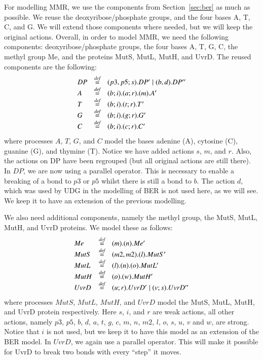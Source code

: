 \documentclass[review]{elsarticle}
\newcommand{\paral}{\; \vert \;}
\newcommand{\bydef}{\stackrel{\emph{def}}{=}}
\begin{document}
For modelling MMR, we use the components from Section~\ref{sec:ber} as much as possible. We reuse the deoxyribose/phosphate groups, and the four bases A, T, C, and G. We will extend those components where needed, but we will keep the original actions. Overall, in order to model MMR, we need the following components: deoxyribose/phosphate groups, the four bases A, T, G, C, the methyl group Me, and the proteins MutS, MutL, MutH, and UvrD. The reused components are the following:
%
$$\begin{array}{lll}
DP & \bydef & (p3,p5;s).DP' \paral (b,d).DP''\\
A & \bydef & (b;i).(a;r).(m).A'\\
T & \bydef & (b;i).(t;r).T'\\
G & \bydef & (b;i).(g;r).G'\\
C & \bydef & (b;i).(c;r).C'\\
\end{array}$$
%
where processes $A$, $T$, $G$, and $C$ model the bases adenine (A), cytosine (C), guanine (G), and thymine (T). Notice we have added actions $s$, $m$, and $r$. Also, the actions on DP have been regrouped (but all original actions are still there). In $DP$, we are now using a parallel operator. This is necessary to enable a breaking of a bond to $p3$ or $p5$ whilst there is still a bond to $b$. The action $d$, which was used by UDG in the modelling of BER is not used here, as we will see. We keep it to have an extension of the previous modelling.

We also need additional components, namely the methyl group, the MutS, MutL, MutH, and UvrD proteins. We model these as follows:
$$\begin{array}{lll}
Me & \bydef & (m).(n).Me'\\
MutS & \bydef & (m2,m2).(l).MutS'\\
MutL & \bydef & (l).(n).(o).MutL'\\
MutH & \bydef & (o).(w).MutH'\\
UvrD & \bydef & (u;r).UvrD' \paral (v;s).UvrD''\\
\end{array}$$
%
where processes $MutS$, $MutL$, $MutH$, and $UvrD$ model the MutS, MutL, MutH, and UvrD protein respectively.  Here $s$, $i$, and $r$ are weak actions, all other actions, namely $p3$, $p5$, $b$, $d$, $a$, $t$, $g$, $c$, $m$, $n$, $m2$, $l$, $o$, $s$, $u$, $v$ and $w$, are strong. Notice that $i$ is not used, but we keep it to have this model as an extension of the BER model. In $UvrD$, we again use a  parallel operator. This will make it possible for UvrD to break two bonds with every ``step'' it moves.
\end{document}
